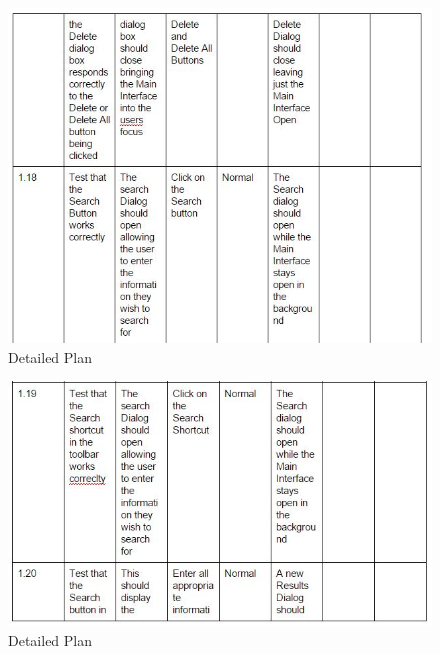 \begin{itemize}
\begin{figure}[H]
    \includegraphics[width=\textwidth]{DP11.JPG}
    \caption{Detailed Plan} \label{fig:VDetailed Plan}
\end{figure}

\begin{figure}[H]
    \includegraphics[width=\textwidth]{DP12.JPG}
    \caption{Detailed Plan} \label{fig:VDetailed Plan}
\end{figure}


\end{itemize}
